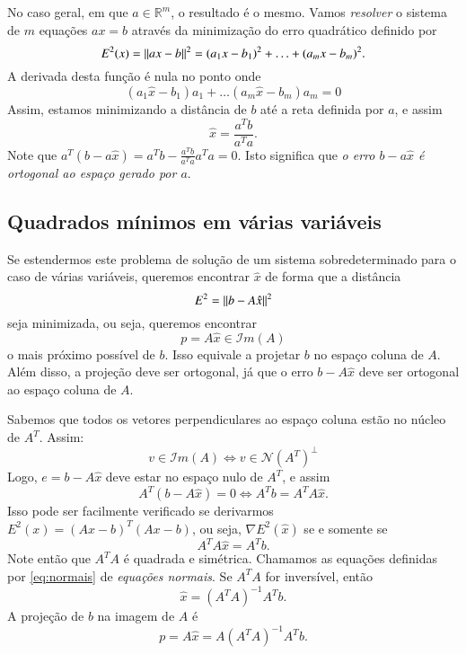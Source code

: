 No caso geral, em que $a\in {\mathbb{R}}^m$, o resultado é o mesmo. Vamos \emph{resolver} o sistema de $m$ equações $ax=b$ através da minimização do erro quadrático definido por
\begin{equation*}
   E^2(x) = \| ax-b \|^2 = (a_1x-b_1)^2 + \ldots + (a_mx-b_m)^2.
\end{equation*}
A derivada desta função é nula no ponto onde
\begin{equation*}
   (a_1\hat{x}-b_1)a_1 + \ldots (a_m\hat{x}-b_m)a_m = 0
\end{equation*}
Assim, estamos minimizando a distância de $b$ até a reta definida por $a$, e assim
 \begin{equation*}
   \hat{x} = \frac{a^Tb}{a^Ta}.
 \end{equation*}
Note que $a^T(b-a\hat{x}) = a^Tb-\frac{a^Tb}{a^Ta}a^Ta=0$. Isto significa que \emph{o erro $b-a\hat{x}$ é ortogonal ao espaço gerado por $a$}.

\subsection{Quadrados mínimos em várias variáveis}

Se estendermos este problema de solução de um sistema sobredeterminado para o caso de várias variáveis, queremos encontrar $\hat{x}$ de forma que a distância 
\begin{equation*}
	E^2 = \| b-A\hat{x} \|^2
\end{equation*}
seja minimizada, ou seja, queremos encontrar 
\begin{equation*}
	p=A\hat{x} \in {\mathcal{I}}m(A)
\end{equation*}
o mais próximo possível de $b$. Isso equivale a projetar $b$ no espaço coluna de $A$. Além disso, a projeção deve ser ortogonal, já que o erro $b-A\hat{x}$ deve ser ortogonal ao espaço coluna de $A$.

Sabemos que todos os vetores perpendiculares ao espaço coluna estão no núcleo de $A^T$. Assim:
\begin{equation*}
	v \in {\mathcal{I}}m (A) \Leftrightarrow v \in {\mathcal{N}}(A^T)^{\perp}
\end{equation*}
Logo, $e=b-A\hat{x}$ deve estar no espaço nulo de $A^T$, e assim
\begin{equation*}
  A^T(b-A\hat{x})=0 \Leftrightarrow A^Tb=A^TA\hat{x}.
\end{equation*}
Isso pode ser facilmente verificado se derivarmos $E^2(x)=(Ax-b)^T(Ax-b)$, ou seja, $\nabla E^2(\hat{x})$ se e somente se 
\begin{equation}\label{eq:normais}
A^TA\hat{x} = A^Tb.
\end{equation}
Note então que $A^TA$ é quadrada e simétrica. Chamamos as equações definidas por \eqref{eq:normais} de \emph{equações normais}. Se $A^TA$ for inversível, então
\begin{equation*}
	\hat{x}=(A^TA)^{-1}A^Tb.
\end{equation*}
A projeção de $b$ na imagem de $A$ é 
\begin{equation*}
   p = A\hat{x} = A(A^TA)^{-1}A^Tb.
\end{equation*}

